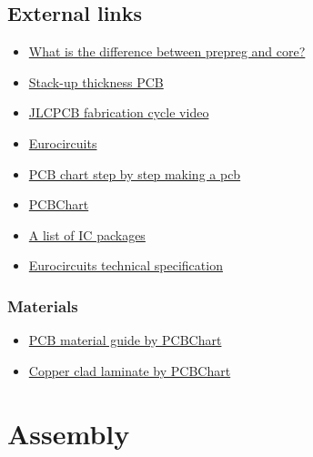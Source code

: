 \documentclass[final]{cubedoc}
\begin{document}
	
	
	\subsection{External links} %
	
	\begin{itemize}
		\item \href{https://electronics.stackexchange.com/questions/356063/what-exactly-is-prepreg-and-core-in-a-pcb}{What is the difference between prepreg and core?}
		\item \href{https://www.cbspcb.com/pcboard-stackups/}{Stack-up thickness PCB} 
		\item \href{https://www.youtube.com/watch?v=ljOoGyCso8s&t=311s}{JLCPCB fabrication cycle video}
		\item \href{https://www.eurocircuits.com/making-a-pcb-pcb-manufacture-step-by-step/}{Eurocircuits} 
		\item \href{https://www.youtube.com/watch?v=sIV0icM_Ujo&t=436s}{PCB chart step by step making a pcb}
		\item \href{https://www.pcbcart.com/article/content/PCB-manufacturing-process.html}{PCBChart}
		\item \href{https://en.wikipedia.org/wiki/List_of_integrated_circuit_packaging_types}{A list of IC packages}
		\item \href{https://www.eurocircuits.com/technical-specifications-of-all-eurocircuits-prototype-small-volume-services-european-origin/}{Eurocircuits technical specification}
	\end{itemize}
	\subsubsection{Materials}
	\begin{itemize}
		\item \href{https://www.pcbcart.com/pcb-capability/pcb-materials.html}{PCB material guide by PCBChart}
		\item \href{https://www.pcbcart.com/article/content/copper-clad-laminate.html}{Copper clad laminate by PCBChart}
	\end{itemize}
	
	
	\section{Assembly}
	
\end{document}
